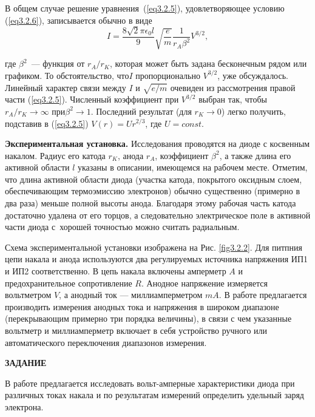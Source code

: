 В общем случае решение уравнения~(\ref{eq3.2.5}), удовлетворяющее условию (\ref{eq3.2.6}), записывается обычно в виде
\begin{equation}
I=\frac{8\sqrt{2}\pi\epsilon_0l}{9}\sqrt{\frac{e}{m}}\frac{1}{r_A\beta^2}V^{3/2},
\label{eq3.2.8}
\end{equation}

где $\beta^2$~--- функция от $r_A/r_K$, которая может быть задана бесконечным рядом или графиком. То обстоятельство, что$I$ пропорционально $V^{3/2}$, уже обсуждалось. Линейный характер связи между $I$ и $\sqrt{e/m}$ очевиден из
рассмотрения правой части (\ref{eq3.2.5}). Численный коэффициент при $V^{3/2}$ выбран так, чтобы $r_A/r_K\rightarrow\infty$ при$\beta^2\rightarrow 1$. Последний результат (для $r_K\rightarrow 0$) легко получить, подставив в (\ref{eq3.2.5}) $ V(r)=Ur^{2/3} $, где $U=const$.

{\bf Экспериментальная установка.} Исследования проводятся на диоде с косвенным накалом. Радиус его катода $r_K$, анода $r_A$,  коэффициент $\beta^2$, а также длина его активной области  $l$  указаны в описании, имеющемся на рабочем месте. Отметим, что длина активной области диода (участка катода, покрытого оксидным слоем, обеспечивающим термоэмиссию электронов) обычно существенно (примерно в два раза) меньше полной высоты анода. Благодаря этому рабочая часть катода достаточно удалена от его торцов, а следовательно  электрическое поле в активной части диода с~хорошей точностью можно считать радиальным.

Схема экспериментальной установки изображена на Рис. \ref{fig3.2.2}. Для питпния цепи накала и анода используются два регулируемых источника напряжения ИП1 и ИП2 соответственно. В цепь накала включены амперметр $A$ и предохранительное сопротивление $R$. Анодное напряжение измеряется вольтметром $V$, а анодный ток --- миллиамперметром $mA$. В работе предлагается производить измерения анодных тока и напряжения в широком диапазоне (перекрывающим примерно три порядка величины), в связи с чем указанные вольтметр и миллиамперметр включает в себя устройство ручного или автоматического переключения диапазонов измерения.  

{\Large \bf ЗАДАНИЕ}

В работе предлагается исследовать вольт-амперные характеристики диода при различных токах накала и по результатам
измерений определить удельный заряд электрона.

